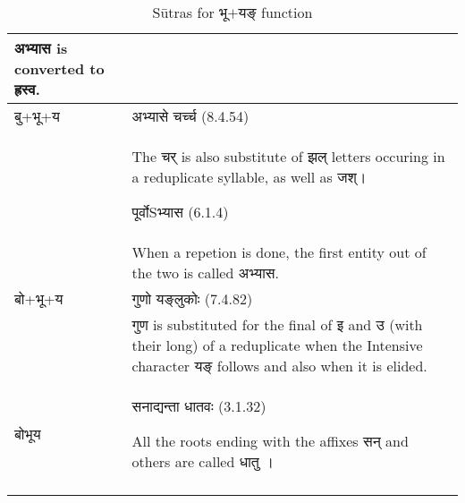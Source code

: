 \begin{longtable}{ |p{1.5cm}|p{14.5cm}| }
			\texthindi{अभ्यास} is converted to \texthindi{ह्रस्व}.
			\\\hline
			\rowcolor{green!10} 
			\texthindi{बु}+\texthindi{भू}+\texthindi{य}
			&\texthindi{अभ्यासे चर्च्च} (8.4.54)  \\
			\rowcolor{green!10}
			&The \texthindi{चर्} is also substitute of \texthindi{झल्} letters occuring in a reduplicate syllable, as well as \texthindi{जश्}।
			
			\texthindi{पूर्वोSभ्यास} (6.1.4)\\
			\rowcolor{green!10}
			&When a repetion is done, the first entity out of the two is called \texthindi{अभ्यास}.
			\\\hline
			\rowcolor{green!10} 
			\texthindi{बो}+\texthindi{भू}+\texthindi{य}
			&\texthindi{गुणो यङ्लुकोः} (7.4.82)\\
			\rowcolor{green!10}
			&\texthindi{गुण} is substituted for the final of \texthindi{इ} and \texthindi{उ} (with their long) of a reduplicate when the Intensive character \texthindi{यङ्} follows and also when it is elided.
			\\\hline
			\rowcolor{yellow!10} 
			\texthindi{बोभूय}
			&\texthindi{सनाद्यन्ता धातवः} (3.1.32)
			
			All the roots ending with the affixes \texthindi{सन्} and others are called \texthindi{धातु} ।
			\\\hline
		
		\caption{Sūtras for \texthindi{भू$+$यङ्} function}
		\label{table:a12}
		\end{longtable}

